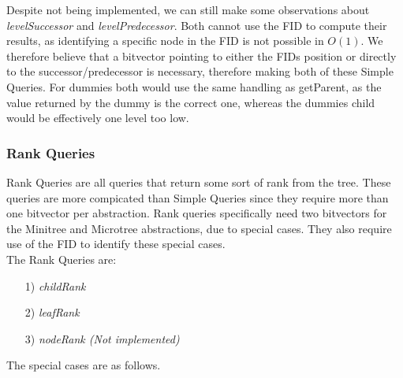 \documentclass{article}
\begin{document}
Despite not being implemented, we can still make some observations about 
\textit{levelSuccessor} and \textit{levelPredecessor}. Both cannot use the FID to compute their results, as identifying a specific node in the FID is not possible in $O(1)$. We therefore believe that a bitvector pointing to either the FIDs position or directly to the successor/predecessor is necessary, therefore making both of these Simple Queries. For dummies both would use the same handling as getParent, as the value returned by the dummy is the correct one, whereas the dummies child would be effectively one level too low.

\subsubsection{Rank Queries}
Rank Queries are all queries that return some sort of rank from the tree. These queries are more compicated than Simple Queries since they require more than one bitvector per abstraction.
Rank queries specifically need two bitvectors for the Minitree and Microtree abstractions, due to special cases.
They also require use of the FID to identify these special cases.\\
The Rank Queries are:\\
\begin{itemize}
	\item[1)] \textit{childRank}
	\item[2)] \textit{leafRank}
	\item[3)] \textit{nodeRank (Not implemented)}
\end{itemize}
The special cases are as follows.\\
\end{document}
